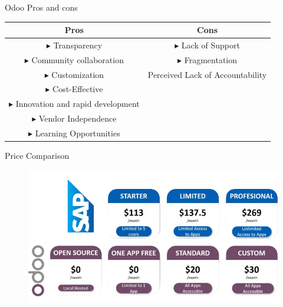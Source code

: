 \begin{frame}{Odoo Pros and cons}
    \begin{table}[]
        \small
        \centering
        \def\arraystretch{1.1}
        \begin{tabular}{|c|c|}
        \hline
          \cellcolor{green!50}\textbf{Pros} & \cellcolor{red!50}\textbf{Cons} \\
        \hline
            $\blacktriangleright$ Transparency & $\blacktriangleright$ Lack of Support \\
            $\blacktriangleright$ Community collaboration & $\blacktriangleright$ Fragmentation \\
            $\blacktriangleright$ Customization & \color{gray}Perceived Lack of Accountability \\
            $\blacktriangleright$ Cost-Effective & \\
            $\blacktriangleright$ Innovation and rapid development & \\
            $\blacktriangleright$ Vendor Independence & \\
            $\blacktriangleright$ Learning Opportunities & \\

        \hline
        \end{tabular}
    \end{table}
    
\end{frame}

\begin{frame}{Price Comparison}
    
\begin{figure}
    \centering
    \includegraphics[width=0.70\linewidth]{assets/OdooPrices-removebg-preview.png}
\end{figure}
\end{frame}

